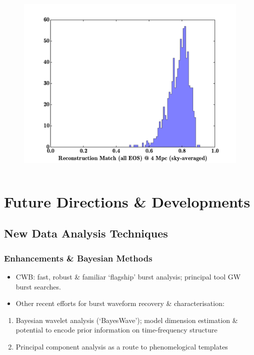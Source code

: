 \documentclass[serif,mathserif,10pt]{beamer}
\let\oldframetitle\frametitle%
\renewcommand{\frametitle}[1]{%
      \oldframetitle{#1}\setstretch{1.2}}
\begin{document}
\begin{frame}
\begin{columns}
        \begin{center}
            \vspace{-0.1cm}
            \begin{figure}
                \includegraphics[width=1.0\columnwidth]{figures/small_scale_matches.pdf}
            \end{figure}
        \end{center}

    \end{columns}

\end{frame}

\section{Future Directions \& Developments}

\subsection{New Data Analysis Techniques}

\begin{frame}
    \frametitle{Enhancements \& Bayesian Methods}
    \begin{itemize}
        \item CWB: fast, robust \& familiar `flagship' burst analysis; principal
            tool GW burst searches.
        \item Other recent efforts for burst waveform recovery \&
            characterisation:
    \end{itemize}
        \begin{enumerate}
            \item Bayesian wavelet analysis (`BayesWave'); model dimension
                estimation \& potential to encode prior information on
                time-frequency structure
           \item Principal component analysis as a route to phenomelogical
               templates 
       \end{enumerate}
\end{frame}
\end{document}
